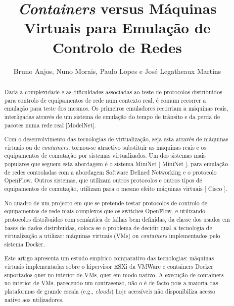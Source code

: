 \documentclass[a4paper]{llncs}
\newcommand{\conts}{\textit{containers}}
\newcommand{\Conts}{\textit{Containers}}
\newcommand{\clouds}{\textit{clouds}}
\begin{document}
\title{{\Conts} versus Máquinas Virtuais para Emulação de Controlo de Redes}
\author{Bruno Anjos, Nuno Morais, Paulo Lopes e Jos\'{e} Legatheaux Martins}
\tocauthor{}




\maketitle              %


\begin{abstract}
Dada a complexidade e as dificuldades associadas ao teste de
protocolos distribuídos para controlo de equipamentos de rede num
contexto real, é comum recorrer a emulação para teste dos mesmos. Os
primeiros emuladores recorriam a máquinas reais, interligadas através
de um sistema de emulação do tempo de trânsito e da perda de pacotes
numa rede real [ModelNet].

Com o desenvolvimento das tecnologias de virtualização, seja esta através de
máquinas virtuais ou de \conts, tornou-se atractivo substituir as
máquinas reais e os equipamentos de comutação por sistemas
virtualizados. Um dos sistemas mais populares que seguem esta
abordagem é o sistema MiniNet [ MiniNet ], para emulação de redes
controladas com a abordagem Software Defined Networking e o protocolo
OpenFlow. Outros sistemas, que utilizam outros protocolos e outros
tipos de equipamentos de comutação, utilizam para o mesmo efeito
máquinas virtuais [ Cisco ].

No quadro de um projecto em que se pretende testar protocolos de
controlo de equipamentos de rede mais complexos que os switches
OpenFlow, e utilizando protocolos distribuídos com semântica de falhas
bem definidas, da classe dos usados em bases de dados distribuídas,
coloca-se o problema de decidir qual a tecnologia de virtualização a
utilizar: máquinas virtuais (VMs) ou {\conts} implementados pelo sistema
Docker.

Este artigo apresenta um estudo empírico comparativo das tecnologias:
máquinas virtuais implementadas sobre o hipervisor 
ESXi da VMWare e containers Docker suportados quer no interior de VMs, quer em modo nativo.
A execução de containers no interior de VMs, parecendo um contrasenso, 
não o é de facto pois a maioria das plataformas de grande escala (e.g., \clouds)
hoje acessíveis não disponibiliza acesso nativo aos utilizadores.


\end{abstract}
\end{document}
